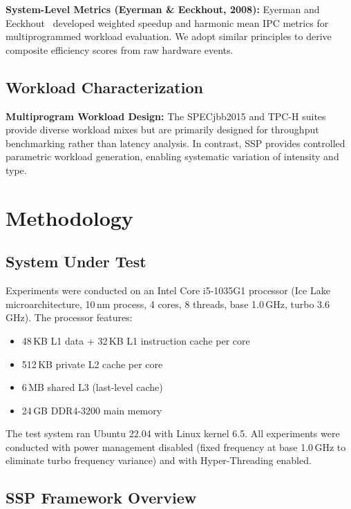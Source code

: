 \documentclass[conference]{IEEEtran}
\begin{document}
\textbf{System-Level Metrics (Eyerman \& Eeckhout, 2008):} Eyerman and
Eeckhout~\cite{eyerman2008system} developed weighted speedup and harmonic mean
IPC metrics for multiprogrammed workload evaluation. We adopt similar principles
to derive composite efficiency scores from raw hardware events.

\subsection{Workload Characterization}

\textbf{Multiprogram Workload Design:} The SPECjbb2015 and TPC-H suites provide
diverse workload mixes but are primarily designed for throughput benchmarking
rather than latency analysis. In contrast, SSP provides controlled parametric
workload generation, enabling systematic variation of intensity and type.

\section{Methodology}
\label{sec:methodology}

\subsection{System Under Test}

Experiments were conducted on an Intel Core i5-1035G1 processor (Ice Lake
microarchitecture, 10\,nm process, 4 cores, 8 threads, base 1.0\,GHz, turbo
3.6\,GHz). The processor features:

\begin{itemize}
  \item 48\,KB L1 data + 32\,KB L1 instruction cache per core
  \item 512\,KB private L2 cache per core
  \item 6\,MB shared L3 (last-level cache)
  \item 24\,GB DDR4-3200 main memory
\end{itemize}

The test system ran Ubuntu 22.04 with Linux kernel 6.5. All experiments were
conducted with power management disabled (fixed frequency at base 1.0\,GHz to
eliminate turbo frequency variance) and with Hyper-Threading enabled.

\subsection{SSP Framework Overview}
\end{document}
